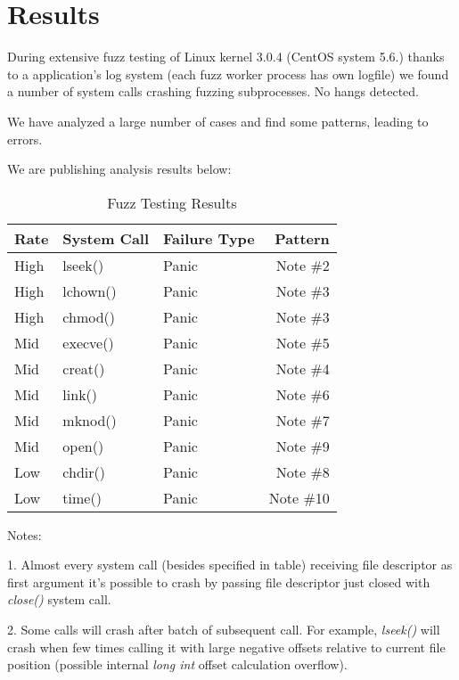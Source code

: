 \documentclass[twoside]{article}
\begin{document}
\begin{multicols}{2}
\begin{enumerate}
\end{enumerate}


\section{Results}

During extensive fuzz testing of Linux kernel 3.0.4 (CentOS system 5.6.) thanks to a application's log system (each fuzz worker process has own logfile) we found a number of system calls crashing fuzzing subprocesses. No hangs detected.

We have analyzed a large number of cases and find some patterns, leading to errors.

We are publishing analysis results below:

\begin{table}[H]
\caption{Fuzz Testing Results}
\centering
\begin{tabular}{lllr}
\toprule
\cmidrule(r){1-4}
Rate & System Call & Failure Type & Pattern \\
\midrule
High & lseek() & Panic &  Note \#2\\
High & lchown() & Panic & Note \#3  \\
High & chmod() & Panic & Note \#3  \\
Mid & execve() & Panic &  Note \#5\\
Mid & creat() & Panic &  Note \#4  \\
Mid & link() & Panic &  Note \#6  \\
Mid & mknod() & Panic &  Note \#7  \\
Mid & open() & Panic &  Note \#9  \\
Low & chdir() & Panic &  Note \#8  \\
Low & time() & Panic &  Note \#10  \\


\bottomrule
\end{tabular}
\end{table}

Notes:
\par
\par

1. Almost every system call (besides specified in table) receiving file descriptor as first argument it's possible to crash by passing file descriptor just closed with \emph{close()} system call.

2. Some calls will crash after batch of subsequent call. For example, \emph{lseek()} will crash when few times calling it with large negative offsets relative to current file position (possible internal \emph{long int} offset calculation overflow).


\end{multicols}
\end{document}
